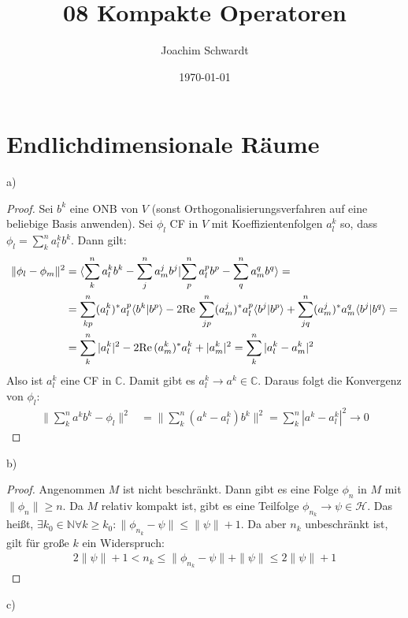 \documentclass[a4paper,12pt]{article}
\newcommand{\brak}{}
\newcommand{\tecxt}{}
\begin{document}
\title{08 Kompakte Operatoren}
\author{Joachim Schwardt}
\date{\today}
\maketitle

\section{Endlichdimensionale Räume}
a)
\begin{proof}
Sei $b^k$ eine ONB von $V$ (sonst Orthogonalisierungsverfahren auf eine beliebige Basis anwenden). Sei $\phi_l$ CF in $V$ mit Koeffizientenfolgen $a_l^k$ so, dass $\phi_l=\sum_k^na_l^kb^k$. Dann gilt:
\begin{align*}
\|\phi_l-\phi_m\|^2&=\brak\langle {\sum_k^na_l^kb^k-\sum_j^na_m^jb^j}| {\sum_p^na_l^pb^p-\sum_q^na_m^qb^q}\rangle=\\
&=\sum_{kp}^n(a_l^k)^\ast a_l^p\brak\langle {b^k}| {b^p}\rangle-2\tecxt\text{Re\,}\sum_{jp}^n(a_m^j)^\ast a_l^p\brak\langle {b^j}| {b^p}\rangle+\sum_{jq}^n (a_m^j)^\ast a_m^q\brak\langle {b^j}| {b^q}\rangle=\\
&=\sum_k^n|a_l^k|^2-2\tecxt\text{Re\,}(a_m^k)^\ast a_l^k +|a_m^k|^2=\sum_k^n|a_l^k-a_m^k|^2
\end{align*}
Also ist $a_l^k$ eine CF in $\mathbb{C}$. Damit gibt es $a_l^k\rightarrow a^k\in\mathbb{C}$. Daraus folgt die Konvergenz von $\phi_l$:
\begin{align*}
\|\sum_k^na^kb^k -\phi_l\|^2&= \|\sum_k^n(a^k-a_l^k)b^k \|^2=\sum_k^n |a^k-a_l^k|^2\rightarrow 0
\end{align*}
\end{proof}
b)
\begin{proof}
Angenommen $M$ ist nicht beschränkt. Dann gibt es eine Folge $\phi_n$ in $M$ mit $\|\phi_n\|\ge n$. Da $M$ relativ kompakt ist, gibt es eine Teilfolge $\phi_{n_k}\rightarrow\psi\in\mathcal{H}$. Das heißt, $\exists k_0\in\mathbb{N}\forall k\ge k_0:\|\phi_{n_k}-\psi\|\le \|\psi\|+1$. Da aber $n_k$ unbeschränkt ist, gilt für große $k$ ein Widerspruch:
\begin{align*}
2\|\psi\|+1<n_k\le \|\phi_{n_k}-\psi\|+\|\psi\|\le 2\|\psi\|+1
\end{align*}
\end{proof}
c)
\end{document}
